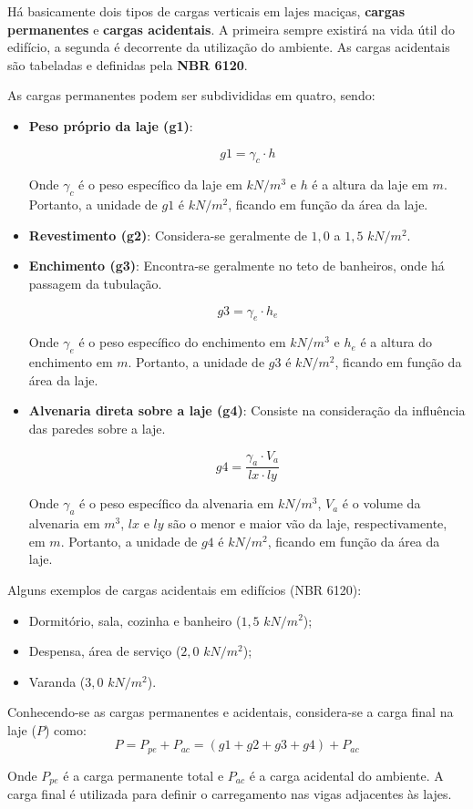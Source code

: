 Há basicamente dois tipos de cargas verticais em lajes maciças, \textbf{cargas permanentes} e \textbf{cargas acidentais}. A primeira sempre existirá na vida útil do edifício, a segunda é decorrente da utilização do ambiente. As cargas acidentais são tabeladas e definidas pela \textbf{NBR 6120}.

As cargas permanentes podem ser subdivididas em quatro, sendo:

\begin{itemize}

	\item \textbf{Peso próprio da laje (g1)}:
	
		$$g1=\gamma_c\cdot h$$

		Onde $\gamma_c$ é o peso específico da laje em $kN/m^3$ e $h$ é a altura da laje em $m$. Portanto, a unidade de $g1$ é $kN/m^2$, ficando em função da área da laje.
		
	\item \textbf{Revestimento (g2)}:
		Considera-se geralmente de $1,0$ a $1,5$ $kN/m^2$.
		
	\item \textbf{Enchimento (g3)}:
		Encontra-se geralmente no teto de banheiros, onde há passagem da tubulação.
		
		$$g3=\gamma_e\cdot h_e$$
		
		Onde $\gamma_e$ é o peso específico do enchimento em $kN/m^3$ e $h_e$ é a altura do enchimento em $m$. Portanto, a unidade de $g3$ é $kN/m^2$, ficando em função da área da laje.
		
	\item \textbf{Alvenaria direta sobre a laje (g4)}:
		Consiste na consideração da influência das paredes sobre a laje.
		
		$$g4=\frac{\gamma_a\cdot V_a}{lx\cdot ly}$$
		
		Onde $\gamma_a$ é o peso específico da alvenaria em $kN/m^3$, $V_a$ é o volume da alvenaria em $m^3$, $lx$ e $ly$ são o menor e maior vão da laje, respectivamente, em $m$. Portanto, a unidade de $g4$ é $kN/m^2$, ficando em função da área da laje.		
		
\end{itemize}

Alguns exemplos de cargas acidentais em edifícios (NBR 6120):

\begin{itemize}
	\item Dormitório, sala, cozinha e banheiro ($1,5$ $kN/m^2$);
	\item Despensa, área de serviço ($2,0$ $kN/m^2$);
	\item Varanda ($3,0$ $kN/m^2$).
\end{itemize}

Conhecendo-se as cargas permanentes e acidentais, considera-se a carga final na laje ($P$) como: $$P=P_{pe}+P_{ac}=(g1+g2+g3+g4)+P_{ac}$$

Onde $P_{pe}$ é a carga permanente total e $P_{ac}$ é a carga acidental do ambiente.
A carga final é utilizada para definir o carregamento nas vigas adjacentes às lajes.